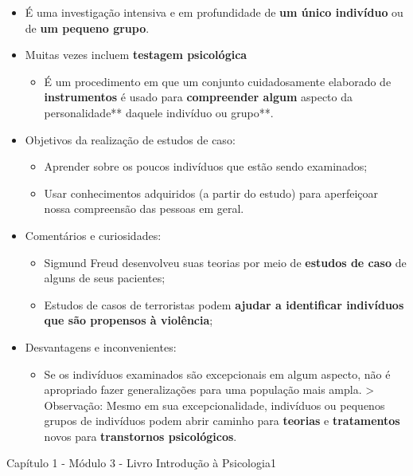 \documentclass[
]{book}
\providecommand{\tightlist}{%
  \setlength{\itemsep}{0pt}\setlength{\parskip}{0pt}}
\begin{document}
\begin{itemize}
\tightlist
\item
  É uma investigação intensiva e em profundidade de \textbf{um único indivíduo} ou de \textbf{um pequeno grupo}.
\item
  Muitas vezes incluem \textbf{testagem psicológica}

  \begin{itemize}
  \tightlist
  \item
    É um procedimento em que um conjunto cuidadosamente elaborado de \textbf{instrumentos} é usado para \textbf{compreender algum }aspecto da personalidade** daquele indivíduo ou grupo**.
  \end{itemize}
\item
  Objetivos da realização de estudos de caso:

  \begin{itemize}
  \tightlist
  \item
    Aprender sobre os poucos indivíduos que estão sendo examinados;
  \item
    Usar conhecimentos adquiridos (a partir do estudo) para aperfeiçoar nossa compreensão das pessoas em geral.
  \end{itemize}
\item
  Comentários e curiosidades:

  \begin{itemize}
  \tightlist
  \item
    Sigmund Freud desenvolveu suas teorias por meio de \textbf{estudos de caso} de alguns de seus pacientes;
  \item
    Estudos de casos de terroristas podem \textbf{ajudar a identificar indivíduos que são propensos à violência};
  \end{itemize}
\item
  Desvantagens e inconvenientes:

  \begin{itemize}
  \tightlist
  \item
    Se os indivíduos examinados são excepcionais em algum aspecto, não é apropriado fazer generalizações para uma população mais ampla.
    \textgreater{} Observação: Mesmo em sua excepcionalidade, indivíduos ou pequenos grupos de indivíduos podem abrir caminho para \textbf{teorias} e \textbf{tratamentos} novos para \textbf{transtornos psicológicos}.
  \end{itemize}
\end{itemize}

Capítulo 1 - Módulo 3 - Livro Introdução à Psicologia1
\end{document}
